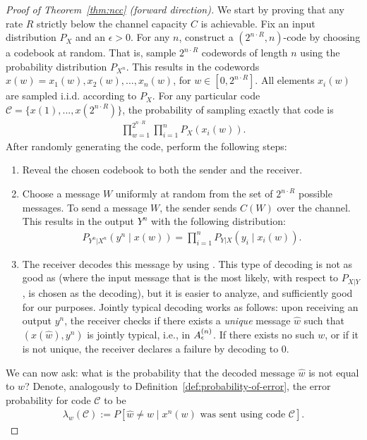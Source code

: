 \begin{proof}[Proof of Theorem~\ref{thm:ncc} (forward direction)]
We start by proving that any rate $R$ strictly below the channel capacity $C$ is achievable. Fix an input distribution $P_X$ and an $\epsilon > 0$. For any $n$, construct a $(2^{n \cdot R},n)$-code by choosing a codebook at random. That is, sample $2^{n\cdot R}$ codewords of length $n$ using the probability distribution $P_{X^n}$. This results in the codewords $x(w) = x_1(w), x_2(w), \dots, x_n(w)$, for $w \in [0,2^{n \cdot R}]$. All elements $x_i(w)$ are sampled i.i.d. according to $P_X$. For any particular code $\mathcal{C} = \{x(1), ..., x(2^{n \cdot R})\}$, the probability of sampling exactly that code is
\begin{align}
\prod_{w = 1}^{2^{n \cdot R}} \prod_{i=1}^n P_X(x_i(w)).
\end{align}
After randomly generating the code, perform the following steps:
\begin{enumerate}
\item Reveal the chosen codebook to both the sender and the receiver.
\item Choose a message $W$ uniformly at random from the set of $2^{n \cdot R}$ possible messages. To send a message $W$, the sender sends $C(W)$ over the channel. This results in the output $Y^n$ with the following distribution:
\begin{align}
P_{Y^n|X^n}(y^n \mid x(w)) = \prod_{i=1}^n P_{Y|X} (y_i \mid x_i(w)).
\end{align}
\item The receiver decodes this message by using . This type of decoding is not as good as  (where the input message that is the most likely, with respect to $P_{X|Y}$, is chosen as the decoding), but it is easier to analyze, and sufficiently good for our purposes. Jointly typical decoding works as follows: upon receiving an output $y^n$, the receiver checks if there exists a \emph{unique} message $\hat{w}$ such that $(x(\hat{w}),y^n)$ is jointly typical, i.e., in $A_{\epsilon}^{(n)}$. If there exists no such $w$, or if it is not unique, the receiver declares a failure by decoding to 0.
\end{enumerate}
We can now ask: what is the probability that the decoded message $\hat{w}$ is not equal to $w$? Denote, analogously to Definition~\ref{def:probability-of-error}, the error probability for code $\mathcal{C}$ to be
\begin{align}
\lambda_w(\mathcal{C}) := P[\hat{w} \neq w \mid x^n(w) \text{ was sent using code } \mathcal{C}].
\end{align}
\end{proof}




